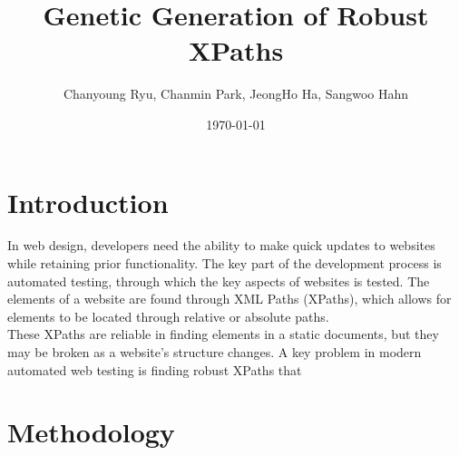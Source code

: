 \documentclass[12pt]{article}
\title{Genetic Generation of Robust XPaths}
\author{\footnotesize Chanyoung Ryu, Chanmin Park, JeongHo Ha, Sangwoo Hahn}
\date{\today}
\begin{document}
\maketitle

\begin{abstract}

\end{abstract}

\section{Introduction}
In web design, developers need the ability to make quick updates to websites while retaining prior functionality. The key part of the development process is automated testing, through which the key aspects of websites is tested. The elements of a website are found through XML Paths (XPaths), which allows for elements to be located through relative or absolute paths.\\
These XPaths are reliable in finding elements in a static documents, but they may be broken as a website's structure changes. A key problem in modern automated web testing is finding robust XPaths that 



\section{Methodology}
\end{document}
